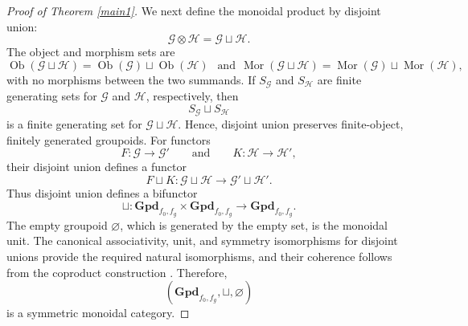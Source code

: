 \documentclass{amsart}
\begin{document}
\begin{proof}[Proof of Theorem \ref{main1}]
We next define the monoidal product by disjoint union:
\[
\mathcal{G}\otimes\mathcal{H}
=
\mathcal{G}\sqcup\mathcal{H}.
\]
The object and morphism sets are
\[
\operatorname{Ob}(\mathcal{G}\sqcup\mathcal{H})
=
\operatorname{Ob}(\mathcal{G})
\sqcup
\operatorname{Ob}(\mathcal{H})
\ \
\mbox{ and}
 \ \
\operatorname{Mor}(\mathcal{G}\sqcup\mathcal{H})
=
\operatorname{Mor}(\mathcal{G})
\sqcup
\operatorname{Mor}(\mathcal{H}),
\]
with no morphisms between the two summands. If $S_{\mathcal{G}}$ and
$S_{\mathcal{H}}$ are finite generating sets for $\mathcal{G}$ and
$\mathcal{H}$, respectively, then
\[
S_{\mathcal{G}}\sqcup S_{\mathcal{H}}
\]
is a finite generating set for $\mathcal{G}\sqcup\mathcal{H}$. Hence, disjoint union preserves finite-object, finitely generated groupoids. For functors
\[
F\colon\mathcal{G}\to\mathcal{G}'
\qquad\text{and}\qquad
K\colon\mathcal{H}\to\mathcal{H}',
\]
their disjoint union defines a functor
\[
F\sqcup K\colon
\mathcal{G}\sqcup\mathcal{H}
\longrightarrow
\mathcal{G}'\sqcup\mathcal{H}'.
\]
Thus disjoint union defines a bifunctor
\[
\sqcup\colon\mathbf{Gpd}_{f_0,f_g}\times\mathbf{Gpd}_{f_0,f_g}\longrightarrow\mathbf{Gpd}_{f_0,f_g}.
\]
The empty groupoid $\varnothing$, which is generated by the empty set, is the monoidal unit. The canonical associativity, unit, and symmetry isomorphisms for disjoint unions provide the required natural isomorphisms, and their coherence follows from the coproduct construction \cite[Section~VII.1, p.~163; Section~XI.1]{maclane1998categories}. Therefore,
\[
(\mathbf{Gpd}_{f_0,f_g},\sqcup,\varnothing)
\]
is a symmetric monoidal category.


\end{proof}
\end{document}
